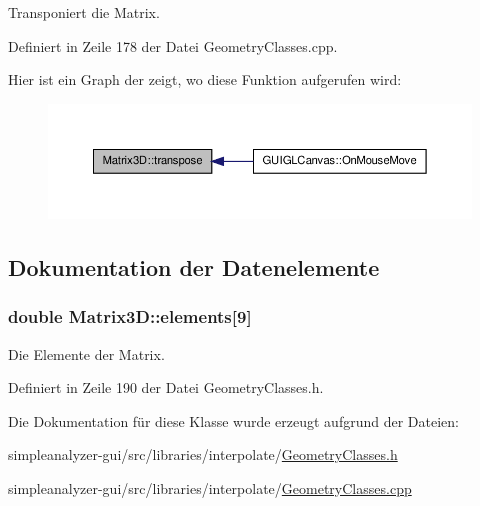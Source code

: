 Transponiert die Matrix. 



Definiert in Zeile 178 der Datei Geometry\-Classes.\-cpp.



Hier ist ein Graph der zeigt, wo diese Funktion aufgerufen wird\-:
\nopagebreak
\begin{figure}[H]
\begin{center}
\leavevmode
\includegraphics[width=350pt]{classMatrix3D_a0d59cb6ea927264477a10b9d427966d6_icgraph}
\end{center}
\end{figure}




\subsection{Dokumentation der Datenelemente}
\hypertarget{classMatrix3D_aa24b85b09060684ec1559f22857ccfee}{
\subsubsection[{elements}]{\setlength{\rightskip}{0pt plus 5cm}double Matrix3\-D\-::elements\mbox{[}9\mbox{]}\hspace{0.3cm}{\ttfamily [private]}}}\label{classMatrix3D_aa24b85b09060684ec1559f22857ccfee}


Die Elemente der Matrix. 



Definiert in Zeile 190 der Datei Geometry\-Classes.\-h.



Die Dokumentation für diese Klasse wurde erzeugt aufgrund der Dateien\-:\begin{DoxyCompactItemize}
\item 
simpleanalyzer-\/gui/src/libraries/interpolate/\hyperlink{GeometryClasses_8h}{Geometry\-Classes.\-h}\item 
simpleanalyzer-\/gui/src/libraries/interpolate/\hyperlink{GeometryClasses_8cpp}{Geometry\-Classes.\-cpp}\end{DoxyCompactItemize}
